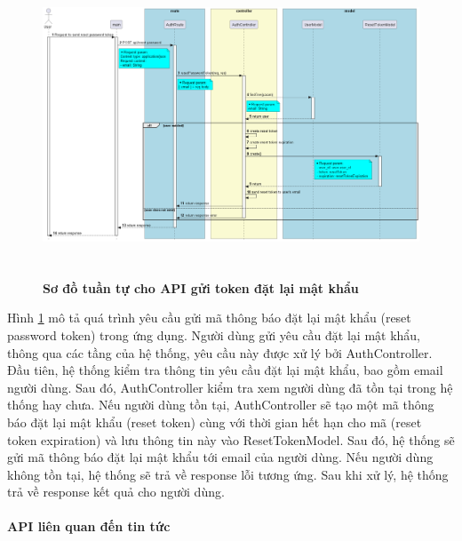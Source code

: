 \begin{figure}[H]
  \centering
  \includegraphics[width=16cm,height=9cm]{Images/server/sequence/server/resetPasswordToken.png}
  \caption[Sơ đồ tuần tự cho API gửi token đặt lại mật khẩu ]{\bfseries \fontsize{12pt}{0pt}
  \selectfont Sơ đồ tuần tự cho API gửi token đặt lại mật khẩu  }
  \label{resetPasswordToken} %
\end{figure}
Hình \ref{resetPasswordToken} mô tả quá trình yêu cầu gửi mã thông báo đặt lại mật khẩu (reset password token) trong ứng dụng. Người dùng gửi yêu cầu đặt lại mật khẩu, thông qua các tầng của hệ thống, yêu cầu này được xử lý bởi AuthController. Đầu tiên, hệ thống kiểm tra thông tin yêu cầu đặt lại mật khẩu, bao gồm email người dùng. Sau đó, AuthController kiểm tra xem người dùng đã tồn tại trong hệ thống hay chưa. Nếu người dùng tồn tại, AuthController sẽ tạo một mã thông báo đặt lại mật khẩu (reset token) cùng với thời gian hết hạn cho mã (reset token expiration) và lưu thông tin này vào ResetTokenModel. Sau đó, hệ thống sẽ gửi mã thông báo đặt lại mật khẩu tới email của người dùng. Nếu người dùng không tồn tại, hệ thống sẽ trả về response lỗi tương ứng. Sau khi xử lý, hệ thống trả về response kết quả cho người dùng.



\paragraph{API liên quan đến tin tức}
\mbox{}


